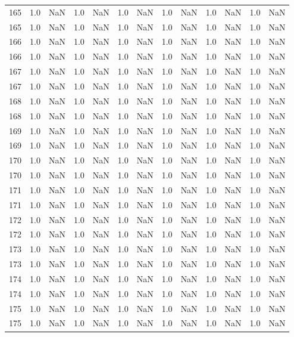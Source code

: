 \begin{tabular}{lrrrrrrrrrrrr}
165 & 1.0 & NaN & 1.0 & NaN & 1.0 & NaN & 1.0 & NaN & 1.0 & NaN & 1.0 & NaN \\
165 & 1.0 & NaN & 1.0 & NaN & 1.0 & NaN & 1.0 & NaN & 1.0 & NaN & 1.0 & NaN \\
166 & 1.0 & NaN & 1.0 & NaN & 1.0 & NaN & 1.0 & NaN & 1.0 & NaN & 1.0 & NaN \\
166 & 1.0 & NaN & 1.0 & NaN & 1.0 & NaN & 1.0 & NaN & 1.0 & NaN & 1.0 & NaN \\
167 & 1.0 & NaN & 1.0 & NaN & 1.0 & NaN & 1.0 & NaN & 1.0 & NaN & 1.0 & NaN \\
167 & 1.0 & NaN & 1.0 & NaN & 1.0 & NaN & 1.0 & NaN & 1.0 & NaN & 1.0 & NaN \\
168 & 1.0 & NaN & 1.0 & NaN & 1.0 & NaN & 1.0 & NaN & 1.0 & NaN & 1.0 & NaN \\
168 & 1.0 & NaN & 1.0 & NaN & 1.0 & NaN & 1.0 & NaN & 1.0 & NaN & 1.0 & NaN \\
169 & 1.0 & NaN & 1.0 & NaN & 1.0 & NaN & 1.0 & NaN & 1.0 & NaN & 1.0 & NaN \\
169 & 1.0 & NaN & 1.0 & NaN & 1.0 & NaN & 1.0 & NaN & 1.0 & NaN & 1.0 & NaN \\
170 & 1.0 & NaN & 1.0 & NaN & 1.0 & NaN & 1.0 & NaN & 1.0 & NaN & 1.0 & NaN \\
170 & 1.0 & NaN & 1.0 & NaN & 1.0 & NaN & 1.0 & NaN & 1.0 & NaN & 1.0 & NaN \\
171 & 1.0 & NaN & 1.0 & NaN & 1.0 & NaN & 1.0 & NaN & 1.0 & NaN & 1.0 & NaN \\
171 & 1.0 & NaN & 1.0 & NaN & 1.0 & NaN & 1.0 & NaN & 1.0 & NaN & 1.0 & NaN \\
172 & 1.0 & NaN & 1.0 & NaN & 1.0 & NaN & 1.0 & NaN & 1.0 & NaN & 1.0 & NaN \\
172 & 1.0 & NaN & 1.0 & NaN & 1.0 & NaN & 1.0 & NaN & 1.0 & NaN & 1.0 & NaN \\
173 & 1.0 & NaN & 1.0 & NaN & 1.0 & NaN & 1.0 & NaN & 1.0 & NaN & 1.0 & NaN \\
173 & 1.0 & NaN & 1.0 & NaN & 1.0 & NaN & 1.0 & NaN & 1.0 & NaN & 1.0 & NaN \\
174 & 1.0 & NaN & 1.0 & NaN & 1.0 & NaN & 1.0 & NaN & 1.0 & NaN & 1.0 & NaN \\
174 & 1.0 & NaN & 1.0 & NaN & 1.0 & NaN & 1.0 & NaN & 1.0 & NaN & 1.0 & NaN \\
175 & 1.0 & NaN & 1.0 & NaN & 1.0 & NaN & 1.0 & NaN & 1.0 & NaN & 1.0 & NaN \\
175 & 1.0 & NaN & 1.0 & NaN & 1.0 & NaN & 1.0 & NaN & 1.0 & NaN & 1.0 & NaN \\

\end{tabular}
